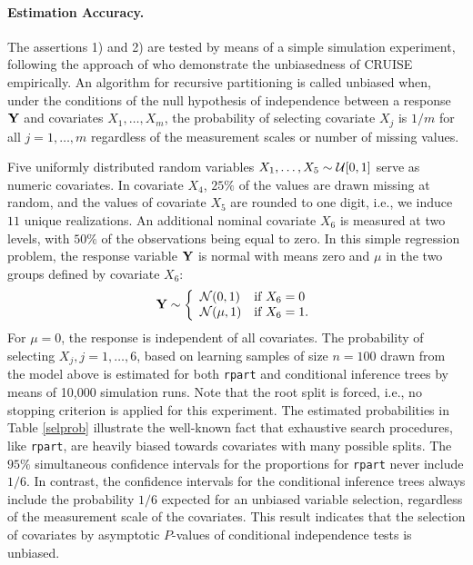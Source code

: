 \paragraph{Estimation Accuracy.}

The assertions 1) and 2) are tested by means of a simple simulation experiment, 
following the approach of \cite{classifica:2001} who demonstrate the unbiasedness 
of CRUISE empirically. An
algorithm for recursive partitioning is called unbiased when, under the
conditions of the null hypothesis of independence between a response 
$\mathbf{Y}$ and covariates $X_1, \dots, X_m$, the probability of selecting
covariate $X_j$ is $1 / m$ for all $j = 1, \dots, m$ regardless of the 
measurement scales or number of missing values. 

Five uniformly distributed random variables $X_1, \dots, X_5 \sim
\mathcal{U}[0,1]$ serve as numeric covariates. 
In covariate $X_4$, $25\%$ of the values are drawn missing at
random, and the values of covariate $X_5$ are rounded to one digit, i.e., 
we induce $11$ unique realizations. An additional nominal covariate $X_6$
is measured at two levels, with $50\%$ of the observations being equal to zero. 
In this simple regression problem,
the response variable $\mathbf{Y}$ is normal with means zero and $\mu$ in the two
groups defined by covariate $X_6$:
\begin{eqnarray*}
\mathbf{Y} \sim \left\{ \begin{array}{ll} \mathcal{N}(0,1) & \text{if } X_6 = 0 \\
                               \mathcal{N}(\mu,1) & \text{if } X_6 = 1.
            \end{array} \right.
\end{eqnarray*}
For $\mu = 0$, the response is independent of all covariates. The
probability of selecting $X_j, j = 1, \dots, 6$, based on learning samples of
size $n = 100$ drawn from the model above is estimated for both
\texttt{rpart} and conditional inference trees by means of 10,000
simulation runs. Note that the root split is forced, i.e., no stopping criterion
is applied for this experiment.
The estimated probabilities in Table \ref{selprob} illustrate
the well-known fact that exhaustive search procedures, like \texttt{rpart},
are heavily biased towards covariates with many possible splits. The $95\%$
simultaneous confidence intervals for the proportions \citep[as described
by][]{Goodman1965} for \texttt{rpart} never include $1 / 6$. In contrast,
the confidence intervals for the conditional inference trees always include
the probability $1 / 6$ expected for an unbiased variable selection,
regardless of the measurement scale of the covariates. This result indicates
that the selection of covariates by asymptotic $P$-values of conditional
independence tests is unbiased.

